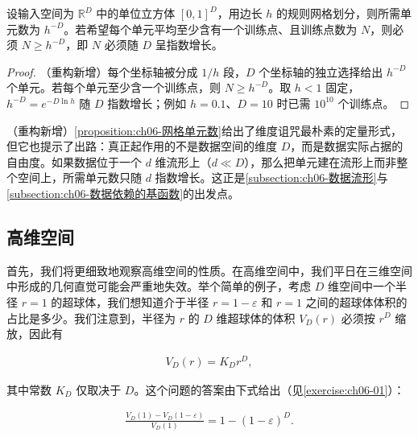 \documentclass[../../main.tex]{subfiles}
\begin{document}
\begin{proposition}[网格单元数的指数增长]\label{proposition:ch06-网格单元数}
设输入空间为 $\mathbb{R}^{D}$ 中的单位立方体 $[0,1]^{D}$，用边长 $h$ 的规则网格划分，则所需单元数为 $h^{-D}$。若希望每个单元平均至少含有一个训练点、且训练点数为 $N$，则必须 $N\geqslant h^{-D}$，即 $N$ 必须随 $D$ 呈指数增长。
\end{proposition}

\begin{proof}
（重构新增）每个坐标轴被分成 $1/h$ 段，$D$ 个坐标轴的独立选择给出 $h^{-D}$ 个单元。若每个单元至少含一个训练点，则 $N\geqslant h^{-D}$。取 $h<1$ 固定，$h^{-D}=e^{-D\ln h}$ 随 $D$ 指数增长；例如 $h=0.1$、$D=10$ 时已需 $10^{10}$ 个训练点。
\end{proof}

\begin{remark}（重构新增）\cref{proposition:ch06-网格单元数}给出了维度诅咒最朴素的定量形式，但它也提示了出路：真正起作用的不是数据空间的维度 $D$，而是数据实际占据的自由度。如果数据位于一个 $d$ 维流形上（$d\ll D$），那么把单元建在流形上而非整个空间上，所需单元数只随 $d$ 指数增长。这正是\cref{subsection:ch06-数据流形}与\cref{subsection:ch06-数据依赖的基函数}的出发点。
\end{remark}

\subsection{高维空间}\label{subsection:ch06-高维空间}

首先，我们将更细致地观察高维空间的性质。在高维空间中，我们平日在三维空间中形成的几何直觉可能会严重地失效。举个简单的例子，考虑 $D$ 维空间中一个半径 $r=1$ 的超球体，我们想知道介于半径 $r=1-\varepsilon$ 和 $r=1$ 之间的超球体体积的占比是多少。我们注意到，半径为 $r$ 的 $D$ 维超球体的体积 $V_D(r)$ 必须按 $r^{D}$ 缩放，因此有

\begin{align}
V_D(r)=K_Dr^{D},
\label{align:ch06-超球体体积}
\end{align}

其中常数 $K_D$ 仅取决于 $D$。这个问题的答案由下式给出（见\cref{exercise:ch06-01}）：

\begin{align}
\frac{V_D(1)-V_D(1-\varepsilon)}{V_D(1)}=1-(1-\varepsilon)^{D}.
\label{align:ch06-薄壳体积占比}
\end{align}
\end{document}
